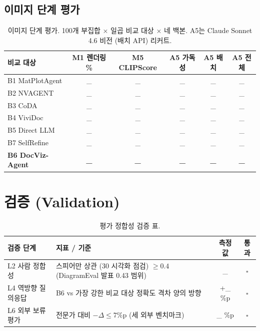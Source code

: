 \documentclass[11pt]{article}
\begin{document}
\subsection{이미지 단계 평가}

\begin{table}[h]
\centering
\small
\begin{tabular}{l|c|c|ccc}
\toprule
비교 대상 & M1 렌더링 \% & M5 CLIPScore & A5 가독성 & A5 배치 & A5 전체 \\
\midrule
B1 MatPlotAgent & \_ & \_ & \_ & \_ & \_ \\
B2 NVAGENT & \_ & \_ & \_ & \_ & \_ \\
B3 CoDA & \_ & \_ & \_ & \_ & \_ \\
B4 ViviDoc & \_ & \_ & \_ & \_ & \_ \\
B5 Direct LLM & \_ & \_ & \_ & \_ & \_ \\
B7 SelfRefine & \_ & \_ & \_ & \_ & \_ \\
\textbf{B6 DocViz-Agent} & \textbf{\_} & \textbf{\_} & \textbf{\_} & \textbf{\_} & \textbf{\_} \\
\bottomrule
\end{tabular}
\caption{이미지 단계 평가. 100개 부집합 × 일곱 비교 대상 × 네 백본. A5는 Claude Sonnet 4.6 비전 (배치 API) 리커트.}
\label{tab:t8}
\end{table}

\section{검증 (Validation)}

\begin{table}[h]
\centering
\small
\begin{tabular}{ll|cc}
\toprule
검증 단계 & 지표 / 기준 & 측정값 & 통과 \\
\midrule
L2 사람 정합성 & 스피어만 상관 (30 시각화 점검) $\geq 0.4$ (DiagramEval 발표 0.43 범위) & \_ & $\square$ \\
L4 역방향 질의응답 & B6 vs 가장 강한 비교 대상 정확도 격차 양의 방향 & +\_ \%p & $\square$ \\
L6 외부 보류 평가 & 전문가 대비 $-\Delta \leq 7\%$p (세 외부 벤치마크) & \_ \%p & $\square$ \\
\bottomrule
\end{tabular}
\caption{평가 정합성 검증 표.}
\label{tab:a3}
\end{table}
\end{document}
